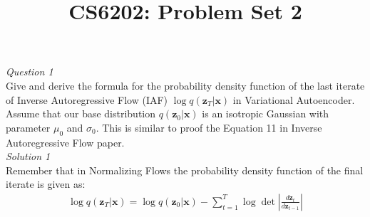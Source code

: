 \documentclass{article}
\title{CS6202: Problem Set 2}
\date{}
\begin{document}
\maketitle

\noindent\emph{Question 1}
\\[3pt]
Give and derive the formula for the probability density function of the last iterate of Inverse Autoregressive Flow (IAF) $\log q(\mathbf{z}_T | \mathbf{x})$ in Variational Autoencoder. Assume that our base distribution $q(\mathbf{z}_0 | \mathbf{x})$ is an isotropic Gaussian with parameter $\mu_0$ and $\sigma_0$. This is similar to proof the Equation 11 in Inverse Autoregressive Flow paper.
\\[10pt]
\emph{Solution 1}
\\[3pt]
Remember that in Normalizing Flows the probability density function of the final iterate is given as:
\begin{align}
	\log q(\mathbf{z}_T | \mathbf{x}) = \log q(\mathbf{z}_0 | \mathbf{x}) - \sum_{t=1}^{T} \log\det \left|\frac{d\mathbf{z}_t}{d\mathbf{z}_{t-1}}\right|
\end{align}
\end{document}
